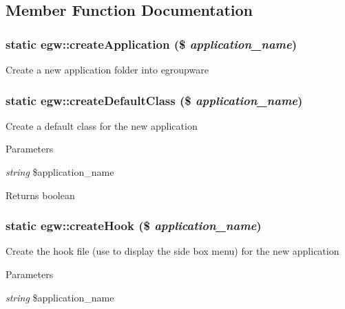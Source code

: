 \subsection{Member Function Documentation}
\hypertarget{classegw_a9ba967a1fb1aaaa8f44cf9bcbf3688ae}{
\subsubsection[{createApplication}]{\setlength{\rightskip}{0pt plus 5cm}static egw::createApplication (\$ {\em application\_\-name})}}
\label{classegw_a9ba967a1fb1aaaa8f44cf9bcbf3688ae}
Create a new application folder into egroupware \hypertarget{classegw_ae56eca08292f4e5f52380e6a161d6d72}{
\subsubsection[{createDefaultClass}]{\setlength{\rightskip}{0pt plus 5cm}static egw::createDefaultClass (\$ {\em application\_\-name})}}
\label{classegw_ae56eca08292f4e5f52380e6a161d6d72}
Create a default class for the new application 
\begin{DoxyParams}{Parameters}
\item[{\em string}]\$application\_\-name \end{DoxyParams}
\begin{DoxyReturn}{Returns}
boolean 
\end{DoxyReturn}
\hypertarget{classegw_ac53872505e1ae6197000bf254fe9712b}{
\subsubsection[{createHook}]{\setlength{\rightskip}{0pt plus 5cm}static egw::createHook (\$ {\em application\_\-name})}}
\label{classegw_ac53872505e1ae6197000bf254fe9712b}
Create the hook file (use to display the side box menu) for the new application 
\begin{DoxyParams}{Parameters}
\item[{\em string}]\$application\_\-name \end{DoxyParams}
